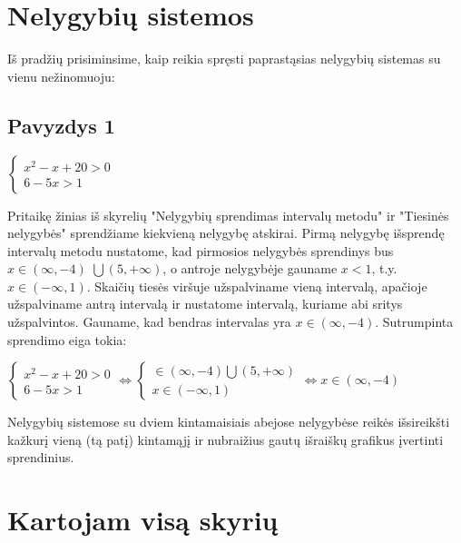 \documentclass[12pt,a4paper]{report}
\numberwithin{table}{chapter}
\numberwithin{figure}{chapter}
\theoremstyle{definition}
\begin{document}
\section{Nelygybių sistemos}

Iš pradžių prisiminsime, kaip reikia spręsti paprastąsias nelygybių sistemas su vienu nežinomuoju:
\subsection{Pavyzdys 1}$\begin{cases} x^2-x+20>0 \\ 6-5x>1 \end{cases}$

Pritaikę žinias iš skyrelių "Nelygybių sprendimas intervalų metodu" ir "Tiesinės nelygybės" sprendžiame kiekvieną nelygybę atskirai. Pirmą nelygybę išsprendę intervalų metodu nustatome, kad pirmosios nelygybės sprendinys
bus $x \in (\infty,-4)$ $ \bigcup (5, +\infty)$, o antroje nelygybėje gauname $x < 1$, t.y. $x \in ( -\infty, 1)$. Skaičių tiesės viršuje užspalviname vieną intervalą, apačioje užspalviname antrą intervalą ir nustatome intervalą, kuriame abi sritys užspalvintos. Gauname,
kad bendras intervalas yra \mbox{$x \in (\infty,-4)$}. Sutrumpinta sprendimo eiga tokia:

$\begin{cases} x^2-x+20>0 \\ 6-5x>1 \end{cases} \Leftrightarrow \begin{cases} \in (\infty,-4) \bigcup (5, +\infty) \\ x \in ( -\infty, 1) \end{cases} \Leftrightarrow x \in (\infty,-4)$

Nelygybių sistemose su dviem kintamaisiais abejose nelygybėse reikės išsireikšti kažkurį vieną (tą patį) kintamąjį ir nubraižius gautų išraiškų grafikus įvertinti sprendinius.

\section{Kartojam visą skyrių}
\end{document}

